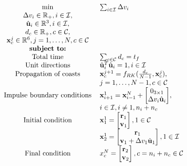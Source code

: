 \begin{align}\label{eq:ms_problem}
    \begin{tabular}{cl}
     \(\min\)                              & \(\sum_{i \in \mathcal{I}} \Delta v_i\)\\
    \(\Delta v_i  \in \R_+, i \in \mathcal{I}\), &  \\
    \(\hat{\uc}_i \in \R^3, i \in \mathcal{I}\),     & \\
    \(d_c         \in \R_+, c \in \mathcal{C}\),     & \\
    \(\x^j_c      \in \R^6, j=1,\dots,N, c \in \mathcal{C}\) & \\
    \textbf{subject to:}        & \\
    Total time                  & \(\sum_{c \in \mathcal{C}} d_c = t_f\) \\
    Unit directions             & \(\hat{\uc}_i^T \hat{\uc}_i = 1, i \in \mathcal{I}\) \\
    Propagation of coasts       & \(\x^{j+1}_c = f_{RK}(\frac{d_c}{N-1}, \x^j_c)\), \\
                                & \(j=1,\dots,N-1, c \in \mathcal{C}\) \\
    Impulse boundary conditions & \(\x^1_{i+1} = \x^{N}_{i-1} + \begin{bmatrix}
        0_{3\times1} \\ \Delta v_i \hat{\mathbf{u}}_i
    \end{bmatrix}\), \\
                                & \(i \in \mathcal{I}, i \neq 1, n_i+n_c\) \\
    Initial condition           & \(\x_1^1 = \begin{bmatrix}
        \mathbf{r}_1 \\ \mathbf{v}_1
    \end{bmatrix}, 1 \in \mathcal{C}\) \\
                                & \(\x_2^1 = \begin{bmatrix}
                                    \mathbf{r}_1 \\ \mathbf{v}_1 + \Delta v_1 \hat{\mathbf{u}}_1
                                \end{bmatrix}, 1 \in \mathcal{I}\) \\
    Final condition             & \(x_c^N = \begin{bmatrix}
        \mathbf{r}_2 \\ \mathbf{v}_2
    \end{bmatrix}, c = n_i+n_c \in \mathcal{C}\) \\

\end{tabular}
\end{align}
